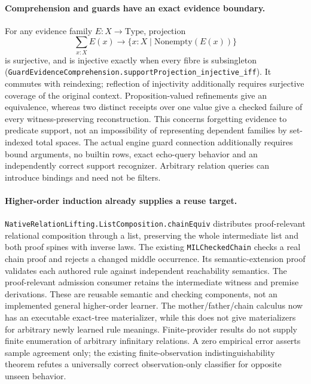 \documentclass[11pt]{article}
\theoremstyle{definition}
\theoremstyle{remark}
\begin{document}
\paragraph{Comprehension and guards have an exact evidence boundary.}
For any evidence family $E:X\to\mathrm{Type}$, projection
\[
  \sum_{x:X}E(x)\longrightarrow\{x:X\mid\mathrm{Nonempty}(E(x))\}
\]
is surjective, and is injective exactly when every fibre is subsingleton
(\nolinkurl{GuardEvidenceComprehension.supportProjection_injective_iff}).
It commutes with reindexing; reflection of injectivity additionally requires
surjective coverage of the original context. Proposition-valued refinements
give an equivalence, whereas two distinct receipts over one value give a
checked failure of every witness-preserving reconstruction. This concerns
forgetting evidence to predicate support, not an impossibility of representing
dependent families by set-indexed total spaces. The actual engine guard
connection additionally requires bound arguments, no builtin rows, exact
echo-query behavior and an independently correct support recognizer.
Arbitrary relation queries can introduce bindings and need not be filters.

\paragraph{Higher-order induction already supplies a reuse target.}
\nolinkurl{NativeRelationLifting.ListComposition.chainEquiv} distributes
proof-relevant relational composition through a list, preserving the whole
intermediate list and both proof spines with inverse laws. The existing
\nolinkurl{MILCheckedChain} checks a real chain proof and rejects a changed
middle occurrence. Its semantic-extension proof validates each authored rule
against independent reachability semantics. The proof-relevant admission
consumer retains the intermediate witness and premise derivations.
These are reusable semantic and checking components, not an implemented
general higher-order learner. The mother/father/chain calculus now has an
executable exact-tree materializer, while this does not give materializers
for arbitrary newly learned rule meanings. Finite-provider results do not supply finite enumeration of arbitrary
infinitary relations. A zero empirical error asserts sample agreement only;
the existing finite-observation indistinguishability theorem refutes a
universally correct observation-only classifier for opposite unseen behavior.
\end{document}
